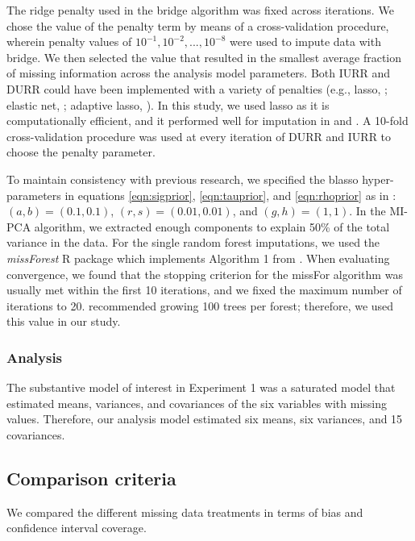 	The ridge penalty used in the bridge algorithm was fixed across iterations.
	We chose the value of the penalty term by means of a cross-validation procedure, wherein penalty values of $10^{-1}, 10^{-2}, ..., 10^{-8}$ were used to impute data with bridge. We then selected the value that resulted in the smallest average fraction of missing information
	\citep[FMI;][eq. 3.1.10]{rubin:1987} across the analysis model parameters. Both IURR and DURR could have been implemented with a variety of penalties (e.g., lasso, \citealp{tibshirani:1996}; elastic net, \citealp{zouHastie:2005}; adaptive lasso, \citealp{zou:2006}).
	In this study, we used lasso as it is computationally efficient, 
	and it performed well for imputation in \cite{zhaoLong:2016} and \cite{dengEtAl:2016}.
	A 10-fold cross-validation procedure was used at every iteration of DURR and IURR to choose the penalty parameter.

	To maintain consistency with previous research, we specified the blasso hyper-parameters in equations 
	\eqref{eqn:sigprior}, \eqref{eqn:tauprior}, and \eqref{eqn:rhoprior} as in \cite{zhaoLong:2016}: 
	$(a,b)=(0.1, 0.1)$, $(r,s)=(0.01, 0.01)$, and $(g,h)=(1,1)$.
	In the MI-PCA algorithm, we extracted enough components to explain 50\% of the total variance in the data.
	For the single random forest imputations, we used the \emph{missForest} R package 
	\citep{missForest} which implements Algorithm 1 from \cite{stekhovenBuhlmann:2011}.
	When evaluating convergence, we found that the stopping criterion for the missFor algorithm was usually met within the first 10 iterations, and we fixed the maximum number of iterations to 20.
	\cite{stekhovenBuhlmann:2011} recommended growing 100 trees per forest; therefore, we used this value in our study.

\subsubsection{Analysis}
	The substantive model of interest in Experiment 1 was a saturated model that estimated means,
	variances, and covariances of the six variables with missing values.
	Therefore, our analysis model estimated six means, six variances, and 15 covariances.

\subsection{Comparison criteria} \label{criteria}

	We compared the different missing data treatments in terms of bias and confidence interval coverage.

